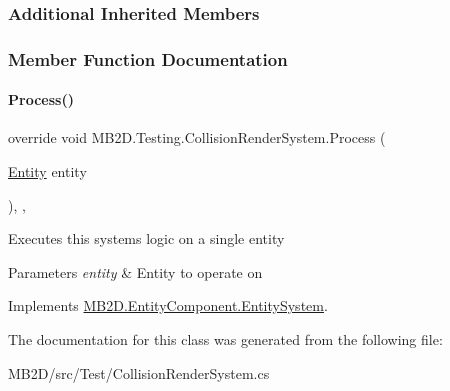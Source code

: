 \subsubsection*{Additional Inherited Members}


\subsubsection{Member Function Documentation}
\hypertarget{class_m_b2_d_1_1_testing_1_1_collision_render_system_af7b7ffdb316533a084e98cbea97a096f}{}\label{class_m_b2_d_1_1_testing_1_1_collision_render_system_af7b7ffdb316533a084e98cbea97a096f} 
\paragraph{\texorpdfstring{Process()}{Process()}}
{\footnotesize\ttfamily override void M\+B2\+D.\+Testing.\+Collision\+Render\+System.\+Process (\begin{DoxyParamCaption}\item[{\hyperlink{class_m_b2_d_1_1_entity_component_1_1_entity}{Entity}}]{entity }\end{DoxyParamCaption})\hspace{0.3cm}{\ttfamily [inline]}, {\ttfamily [protected]}, {\ttfamily [virtual]}}



Executes this systems logic on a single entity 


\begin{DoxyParams}{Parameters}
{\em entity} & Entity to operate on\\
\hline
\end{DoxyParams}


Implements \hyperlink{class_m_b2_d_1_1_entity_component_1_1_entity_system_abbf83b87cb5d12754fb058cef50451fa}{M\+B2\+D.\+Entity\+Component.\+Entity\+System}.



The documentation for this class was generated from the following file\+:\begin{DoxyCompactItemize}
\item 
M\+B2\+D/src/\+Test/Collision\+Render\+System.\+cs\end{DoxyCompactItemize}
